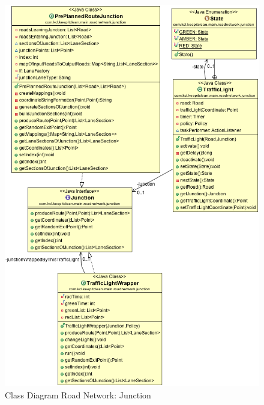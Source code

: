 \documentclass[11pt]{article}
\begin{document}
\begin{enumerate}
\begin{figure}[H]
        \includegraphics[width=12cm]{junction} 
        \centering
        \caption{Class Diagram Road Network: Junction} 
        \label{cdjunction}
\end{figure}


\end{enumerate}
\end{document}
